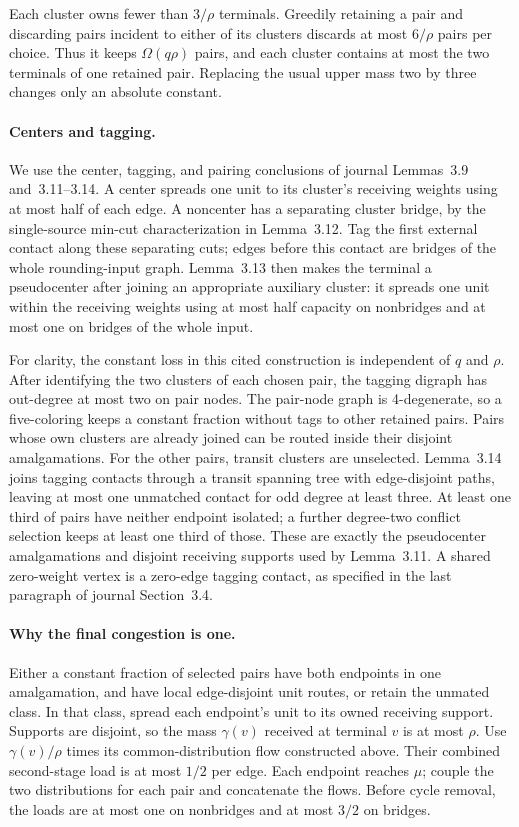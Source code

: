 \documentclass[acmsmall,11pt,screen,nonacm]{acmart}
\begin{document}
Each cluster owns fewer than $3/\rho$ terminals. Greedily retaining a pair
and discarding pairs incident to either of its clusters discards at most
$6/\rho$ pairs per choice. Thus it keeps $\Omega(q\rho)$ pairs, and each
cluster contains at most the two terminals of one retained pair. Replacing
the usual upper mass two by three changes only an absolute constant.

\paragraph{Centers and tagging.}
We use the center, tagging, and pairing conclusions of journal
Lemmas~3.9 and~3.11--3.14. A center spreads one unit to its cluster's
receiving weights using at most half of each edge. A noncenter has a
separating cluster bridge, by the single-source min-cut characterization
in Lemma~3.12. Tag the first external contact along these separating cuts;
edges before this contact are bridges of the whole rounding-input graph.
Lemma~3.13 then makes the terminal a pseudocenter after joining an
appropriate auxiliary cluster: it spreads one unit within the receiving
weights using at most half capacity on nonbridges and at most one on
bridges of the whole input.

For clarity, the constant loss in this cited construction is independent
of $q$ and $\rho$. After identifying the two clusters of each chosen
pair, the tagging digraph has out-degree at most two on pair nodes.
The pair-node graph is 4-degenerate, so a five-coloring keeps a constant
fraction without tags to other retained pairs. Pairs whose own clusters
are already joined can be routed inside their disjoint amalgamations.
For the other pairs, transit clusters are unselected. Lemma~3.14 joins
tagging contacts through a transit spanning tree with edge-disjoint paths,
leaving at most one unmatched contact for odd degree at least three.
At least one third of pairs have neither endpoint isolated; a further
degree-two conflict selection keeps at least one third of those. These
are exactly the pseudocenter amalgamations and disjoint receiving supports
used by Lemma~3.11. A shared zero-weight vertex is a zero-edge tagging
contact, as specified in the last paragraph of journal Section~3.4.

\paragraph{Why the final congestion is one.}
Either a constant fraction of selected pairs have both endpoints in one
amalgamation, and have local edge-disjoint unit routes, or retain the
unmated class. In that class, spread each endpoint's unit to its owned
receiving support. Supports are disjoint, so the mass $\gamma(v)$ received
at terminal $v$ is at most $\rho$. Use $\gamma(v)/\rho$ times its
common-distribution flow constructed above. Their combined second-stage
load is at most $1/2$ per edge. Each endpoint reaches $\mu$; couple the
two distributions for each pair and concatenate the flows. Before cycle
removal, the loads are at most one on nonbridges and at most $3/2$ on bridges.
\end{document}
